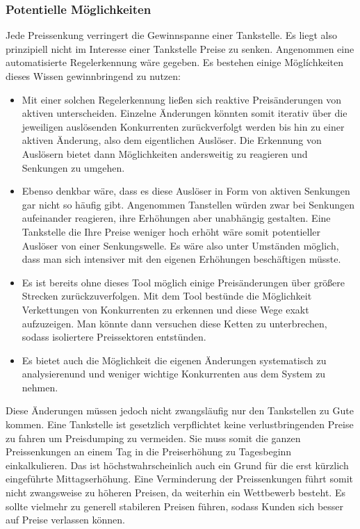 \documentclass[12pt,a4paper,bibliography=totocnumbered,listof=totocnumbered]{scrartcl}
\begin{document}
\subsubsection{Potentielle Möglichkeiten}
Jede Preissenkung verringert die Gewinnspanne einer Tankstelle. Es liegt also prinzipiell nicht im Interesse einer Tankstelle Preise zu senken. Angenommen eine automatisierte Regelerkennung wäre gegeben. Es bestehen einige Möglíchkeiten dieses Wissen gewinnbringend zu nutzen:
\begin{itemize}
\item Mit einer solchen Regelerkennung ließen sich reaktive Preisänderungen von aktiven unterscheiden. Einzelne Änderungen könnten somit iterativ über die jeweiligen auslösenden Konkurrenten zurückverfolgt werden bis hin zu einer aktiven Änderung, also dem eigentlichen Auslöser. Die Erkennung von Auslösern bietet dann Möglichkeiten andersweitig zu reagieren und Senkungen zu umgehen.
\item Ebenso denkbar wäre, dass es diese Auslöser in Form von aktiven Senkungen gar nicht so häufig gibt. Angenommen Tanstellen würden zwar bei Senkungen aufeinander reagieren, ihre Erhöhungen aber unabhängig gestalten. Eine Tankstelle die Ihre Preise weniger hoch erhöht wäre somit potentieller Auslöser von einer Senkungswelle. Es wäre also unter Umständen möglich, dass man sich intensiver mit den eigenen Erhöhungen beschäftigen müsste.
\item Es ist bereits ohne dieses Tool möglich einige Preisänderungen über größere Strecken zurückzuverfolgen. Mit dem Tool bestünde die Möglichkeit Verkettungen von Konkurrenten zu erkennen und diese Wege exakt aufzuzeigen. Man könnte dann versuchen diese Ketten zu unterbrechen, sodass isoliertere Preissektoren entstünden.
\item Es bietet auch die Möglichkeit die eigenen Änderungen systematisch zu analysierenund und weniger wichtige Konkurrenten aus dem System zu nehmen.
\end{itemize}
Diese Änderungen müssen jedoch nicht zwangsläufig nur den Tankstellen zu Gute kommen. Eine Tankstelle ist gesetzlich verpflichtet keine verlustbringenden Preise zu fahren um Preisdumping zu vermeiden. Sie muss somit die ganzen Preissenkungen an einem Tag in die Preiserhöhung zu Tagesbeginn einkalkulieren. Das ist höchstwahrscheinlich auch ein Grund für die erst kürzlich eingeführte Mittagserhöhung. Eine Verminderung der Preissenkungen führt somit nicht zwangsweise zu höheren Preisen, da weiterhin ein Wettbewerb besteht. Es sollte vielmehr zu generell stabileren Preisen führen, sodass Kunden sich besser auf Preise verlassen können.
\end{document}
